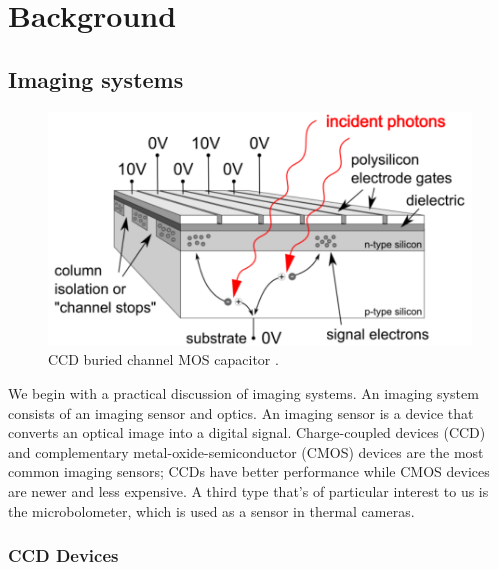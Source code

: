 \section{Background}\label{sec:background}
\localtableofcontents
\subsection{Imaging systems}\label{subsec:imaging-systems}
\begin{figure}[!htbp]
	\includegraphics[width=\linewidth,keepaspectratio]{figures/background/bccd.png}
	\caption{CCD buried channel MOS capacitor \cite{finaltestguideline}.}
	\label{fig:mos-cap}
\end{figure}

We begin with a practical discussion of imaging systems.
%
An imaging system consists of an imaging sensor and optics. 
%
An imaging sensor is a device that converts an optical image into a digital signal.
%
Charge-coupled devices (CCD) and complementary metal-oxide-semiconductor (CMOS) devices are the most common imaging sensors; CCDs have better performance while CMOS devices are newer and less expensive.
%
A third type that's of particular interest to us is the microbolometer, which is used as a sensor in thermal cameras.

\subsubsection{CCD Devices}

